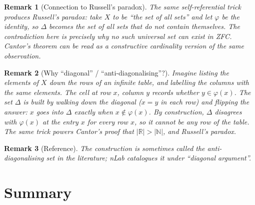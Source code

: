 \documentclass[11pt]{article}
\theoremstyle{defstyle}
\theoremstyle{thmstyle}
\theoremstyle{notstyle}
\newtheorem*{remark}{Remark}
\theoremstyle{cautionstyle}
\newcommand{\N}{\mathbb{N}}
\newcommand{\R}{\mathbb{R}}
\begin{document}
\begin{notebox}
\begin{remark}[Connection to Russell's paradox]
The same self-referential trick produces Russell's paradox: take $X$ to be
``the set of all sets'' and let $\varphi$ be the identity, so $\Delta$
becomes the set of all sets that do not contain themselves. The
contradiction here is precisely why no such universal set can exist in ZFC.
Cantor's theorem can be read as a constructive cardinality version of the
same observation.
\end{remark}
\end{notebox}

\begin{notebox}
\begin{remark}[Why ``diagonal'' / ``anti-diagonalising''?]
Imagine listing the elements of $X$ down the rows of an infinite table, and
labelling the columns with the same elements. The cell at row $x$, column $y$
records whether $y \in \varphi(x)$. The set $\Delta$ is built by walking
\emph{down the diagonal} ($x = y$ in each row) and flipping the answer:
$x$ goes into $\Delta$ exactly when $x \notin \varphi(x)$. By construction,
$\Delta$ disagrees with $\varphi(x)$ at the entry $x$ for every row $x$, so it
cannot be any row of the table. The same trick powers Cantor's proof that
$|\R| > |\N|$, and Russell's paradox.
\end{remark}
\end{notebox}

\begin{notebox}
\begin{remark}[Reference]
The construction is sometimes called the \emph{anti-diagonalising set} in the
literature; nLab catalogues it under ``diagonal argument''.
\end{remark}
\end{notebox}

\section{Summary}
\end{document}
